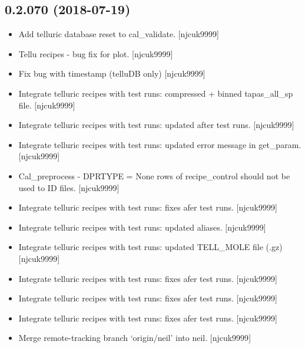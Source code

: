 \documentclass[a4paper,10pt,english]{report}
\begin{document}
\subsection{0.2.070 (2018-07-19)}
\label{\detokenize{misc/changelog:id386}}\begin{itemize}
\item {} 
Add telluric database reset to cal\_validate. {[}njcuk9999{]}

\item {} 
Tellu recipes - bug fix for plot. {[}njcuk9999{]}

\item {} 
Fix bug with timestamp (telluDB only) {[}njcuk9999{]}

\item {} 
Integrate telluric recipes with test runs: compressed + binned
tapas\_all\_sp file. {[}njcuk9999{]}

\item {} 
Integrate telluric recipes with test runs: updated after test runs.
{[}njcuk9999{]}

\item {} 
Integrate telluric recipes with test runs: updated error message in
get\_param. {[}njcuk9999{]}

\item {} 
Cal\_preprocess - DPRTYPE = None  rows of recipe\_control should not be
used to ID files. {[}njcuk9999{]}

\item {} 
Integrate telluric recipes with test runs: fixes afer test runs.
{[}njcuk9999{]}

\item {} 
Integrate telluric recipes with test runs: updated aliases.
{[}njcuk9999{]}

\item {} 
Integrate telluric recipes with test runs: updated TELL\_MOLE file
(.gz) {[}njcuk9999{]}

\item {} 
Integrate telluric recipes with test runs: fixes afer test runs.
{[}njcuk9999{]}

\item {} 
Integrate telluric recipes with test runs: fixes afer test runs.
{[}njcuk9999{]}

\item {} 
Integrate telluric recipes with test runs: fixes afer test runs.
{[}njcuk9999{]}

\item {} 
Merge remote-tracking branch ‘origin/neil’ into neil. {[}njcuk9999{]}

\end{itemize}
\end{document}

